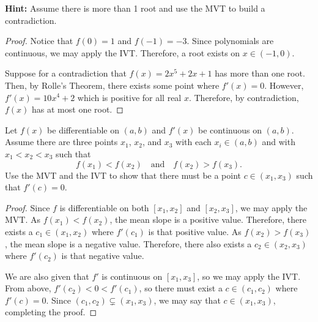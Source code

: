 \textbf{Hint:} Assume there is more than 1 root and use the MVT to build a contradiction.
\begin{proof}
  Notice that $f(0) = 1$ and $f(-1) = -3$.
  Since polynomials are continuous, we may apply the IVT\@.
  Therefore, a root exists on $x\in(-1,0)$.

  Suppose for a contradiction that $f(x) = 2x^5 + 2x + 1$ has more than one root.
  Then, by Rolle's Theorem, there exists some point where $f'(x) = 0$.
  However, $f'(x) = 10x^4 + 2$ which is positive for all real $x$.
  Therefore, by contradiction, $f(x)$ has at most one root.
\end{proof}


\question Let $f(x)$ be differentiable on $(a, b)$ and $f'(x)$ be continuous on $(a, b)$.
Assume there are three points $x_1$, $x_2$, and $x_3$ with each $x_i\in(a,b)$
and with $x_1<x_2<x_3$ such that \[ f(x_1) < f(x_2) \quad \textrm{and} \quad f(x_2) > f(x_3). \]
Use the MVT and the IVT to show that there must be a point $c\in(x_1, x_3)$ such that $f'(c) = 0$.
\begin{proof}
  Since $f$ is differentiable on both $[x_1,x_2]$ and $[x_2, x_3]$, we may apply the MVT\@.
  As $f(x_1) < f(x_2)$, the mean slope is a positive value.
  Therefore, there exists a $c_1\in(x_1,x_2)$ where $f'(c_1)$ is that positive value.
  As $f(x_2) > f(x_3)$, the mean slope is a negative value.
  Therefore, there also exists a $c_2\in(x_2,x_3)$ where $f'(c_2)$ is that negative value.
  
  We are also given that $f'$ is continuous on $[x_1,x_3]$, so we may apply the IVT\@.
  From above, $f'(c_2) < 0 < f'(c_1)$, so there must exist a $c\in(c_1,c_2)$ where $f'(c)=0$.
  Since $(c_1,c_2) \subsetneq (x_1,x_3)$, we may say that $c\in(x_1,x_3)$, completing the proof.
\end{proof}

